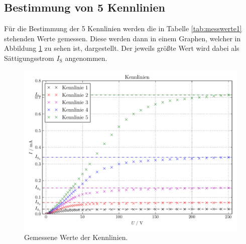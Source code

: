 \documentclass[
  bibliography=totoc,     %
  captions=tableheading,  %
  titlepage=firstiscover, %
]{scrartcl}
\begin{document}
\subsection{Bestimmung von 5 Kennlinien}
Für die Bestimmung der 5 Kennlinien werden die in Tabelle \ref{tab:messwerte1}
stehenden Werte gemessen.
Diese werden dann in einem Graphen, welcher in Abbildung \ref{fig:plot1} zu
sehen ist, dargestellt. Der jeweils größte Wert wird dabei als
Sättigungsstrom $I_\mathup{S}$ angenommen.
\begin{figure}
  \centering
  \includegraphics[width=\textwidth]{Plot.pdf}
  \caption{Gemessene Werte der Kennlinien.}
  \label{fig:plot1}
\end{figure}
\end{document}
